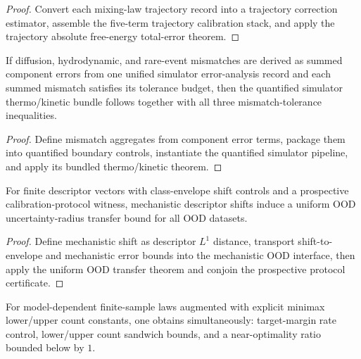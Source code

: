 \begin{proof}
Convert each mixing-law trajectory record into a trajectory correction estimator, assemble the five-term trajectory calibration stack, and apply the trajectory absolute free-energy total-error theorem.
\end{proof}

\begin{theorem}\label{thm:unified-simulator-error-analysis-controlled-thermo-kinetic}
If diffusion, hydrodynamic, and rare-event mismatches are derived as summed component errors from one unified simulator error-analysis record and each summed mismatch satisfies its tolerance budget, then the quantified simulator thermo/kinetic bundle follows together with all three mismatch-tolerance inequalities.
\end{theorem}

\begin{proof}
Define mismatch aggregates from component error terms, package them into quantified boundary controls, instantiate the quantified simulator pipeline, and apply its bundled thermo/kinetic theorem.
\end{proof}

\begin{theorem}\label{thm:descriptor-calibrated-mechanistic-ood-transfer}
For finite descriptor vectors with class-envelope shift controls and a prospective calibration-protocol witness, mechanistic descriptor shifts induce a uniform OOD uncertainty-radius transfer bound for all OOD datasets.
\end{theorem}

\begin{proof}
Define mechanistic shift as descriptor $L^1$ distance, transport shift-to-envelope and mechanistic error bounds into the mechanistic OOD interface, then apply the uniform OOD transfer theorem and conjoin the prospective protocol certificate.
\end{proof}

\begin{theorem}\label{thm:model-dependent-minimax-optimality-bundle}
For model-dependent finite-sample laws augmented with explicit minimax lower/upper count constants, one obtains simultaneously: target-margin rate control, lower/upper count sandwich bounds, and a near-optimality ratio bounded below by $1$.
\end{theorem}

